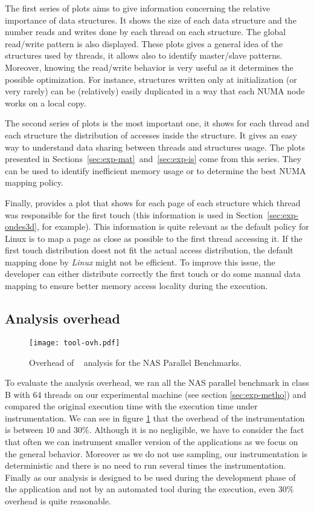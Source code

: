 The first series of plots aims to give information concerning the relative
importance of data structures. It shows the size of each data structure and the
number reads and writes done by each thread on each structure. The global
read/write pattern is also displayed. These plots gives a general idea of the
structures used by threads, it allows also to identify master/slave patterns.
Moreover, knowing the read/write behavior is very useful as it determines the
possible optimization. For instance, structures written only at initialization
(or very rarely) can be (relatively) easily duplicated in a way that each NUMA
node works on a local copy.

The second series of plots is the most important one, it shows for
each thread and each structure the distribution of accesses inside the
structure. It gives an easy way to understand data sharing between threads and
structures usage. The plots presented in Sections~\ref{sec:exp-mat}~and~\ref{sec:exp-is} come from this series. They can be used to identify inefficient memory usage or to determine the best NUMA mapping
policy.

Finally, \TABARNAC provides a plot that shows for each page of each structure
which thread was responsible for the first touch (this information is used in Section~\ref{sec:exp-ondes3d}, for example). This information is quite relevant as the default
policy for Linux is to map a page as close as possible to the first thread
accessing it. If the first touch distribution doest not fit the actual access
distribution, the default mapping done by \emph{Linux} might not be efficient.
To improve this issue, the developer can either distribute correctly the first touch or do some
manual data mapping to ensure better memory access locality during the execution.

\subsection{Analysis overhead}
\label{sec:expe-overhead}

\begin{figure}[htb]
    \centering
    \texttt{[image: tool-ovh.pdf]}
    \caption{Overhead of \TABARNAC~ analysis for the NAS Parallel Benchmarks.}
    \label{fig:ovh}
\end{figure}

To evaluate the analysis overhead, we ran all the NAS parallel benchmark in
class B with 64 threads on our experimental machine (see section
\ref{sec:exp-metho}) and compared the original execution time with the
execution time under instrumentation. We can see in figure \ref{fig:ovh} that
the overhead of the instrumentation is between $10$ and $30\%$. Although it is
no negligible, we have to consider the fact that often we can instrument
smaller version of the applications as we focus on the general behavior.
Moreover as we do not use sampling, our instrumentation is deterministic and
there is no need to run several times the instrumentation. Finally as our
analysis is designed to be used during the development phase of the
application and not by an automated tool during the execution, even $30\%$
overhead is quite reasonable.
